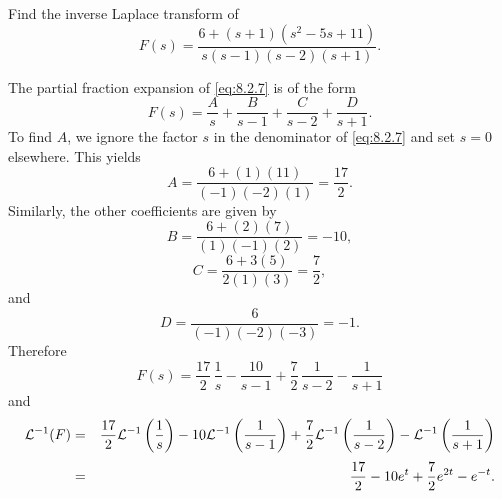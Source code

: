 \setcounter{example}{4}
\setcounter{equation}{6}
\begin{example}
  \label{example:8.2.5}\rm Find the inverse Laplace transform of
  \begin{equation}
    \label{eq:8.2.7}F(s)=\frac{6+(s+1)(s^{2}-5s+11)}{s(s-1)(s-2)(s+1)}.
  \end{equation}
\end{example}
\setcounter{equation}{7}
\begin{examplesolution}
\solution The partial fraction expansion of \eqref{eq:8.2.7} is of the form
\begin{equation}
  \label{eq:8.2.8}F(s)=\frac{A}{s}+\frac{B}{s-1}+\frac{C}{s-2}+\frac{D}{s+1}.
\end{equation}
To find $A$, we ignore the factor $s$ in the denominator of \eqref{eq:8.2.7} and set $s=0$
elsewhere. This yields
\[
  A=\frac{6+(1)(11)}{(-1)(-2)(1)}=\frac{17}{2}.
\]
Similarly, the other coefficients are given by
\[
  B=\frac{6+(2)(7)}{(1)(-1)(2)}=-10,
\]
\[
  C=\frac{6+3(5)}{2(1)(3)}=\frac{7}{2},
\]
and
\[
  D=\frac{6}{(-1)(-2)(-3)}=-1.
\]
Therefore
\[
  F(s)=\frac{17}{2}\,\frac{1}{s}-\frac{10}{s-1}+\frac{7}{2}\,\frac{1}{s-2}-\frac{1}{s+1}
\]
and
\begin{eqnarray*}
  {\cal L}^{-1}(F) & = & \frac{17}{2}{\cal L}^{-1}\left(\frac{1}{s}\right)-10{\cal L}^{-1}\left(\frac{1}{s-1}\right)+\frac{7}{2}{\cal L}^{-1}\left(\frac{1}{s-2}\right)-{\cal L}^{-1}\left(\frac{1}{s+1}\right) \\[1\jot]
                   & = & \frac{17}{2}-10e^{t}+\frac{7}{2}e^{2t}-e^{-t}.
\end{eqnarray*}

\relax
{}
\color{black}
\end{examplesolution}

